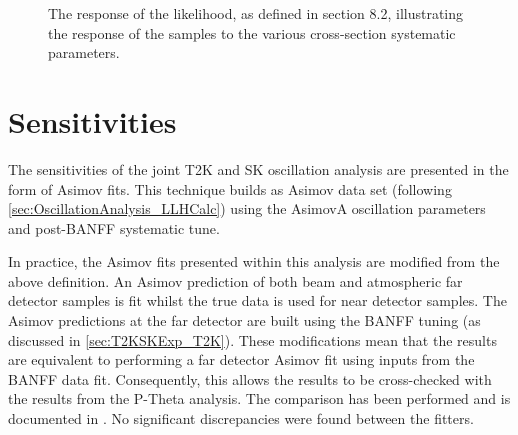 \begin{figure}[h]
\begin{subfigure}[t]{0.5\textwidth}
  \end{subfigure}
  \caption{The response of the likelihood, as defined in section 8.2, illustrating the response of the samples to the various cross-section systematic parameters.}
  \label{fig:OscillationAnalysis_LLHScanSystPars}
\end{figure}

\clearpage
\section{Sensitivities}
\label{sec:OscillationAnalysis_Sensitivities}

The sensitivities of the joint T2K and SK oscillation analysis are presented in the form of Asimov fits. This technique builds as Asimov data set (following \autoref{sec:OscillationAnalysis_LLHCalc}) using the AsimovA oscillation parameters and post-BANFF systematic tune.

In practice, the Asimov fits presented within this analysis are modified from the above definition. An Asimov prediction of both beam and atmospheric far detector samples is fit whilst the true data is used for near detector samples. The Asimov predictions at the far detector are built using the BANFF tuning (as discussed in \autoref{sec:T2KSKExp_T2K}). These modifications mean that the results are equivalent to performing a far detector Asimov fit using inputs from the BANFF data fit. Consequently, this allows the results to be cross-checked with the results from the P-Theta analysis. The comparison has been performed and is documented in \cite{barrow_M3_PT_Comp}. No significant discrepancies were found between the fitters.

